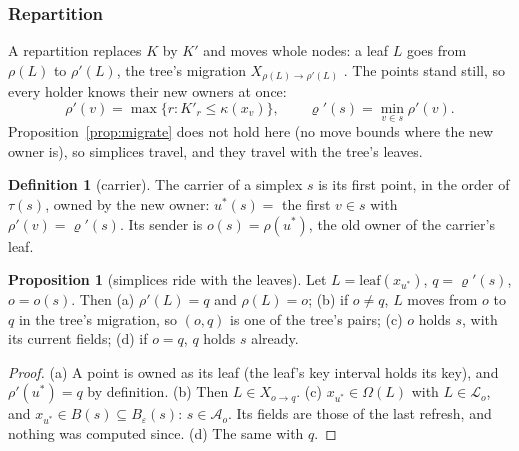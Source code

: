 \documentclass[10pt,a4paper]{article}
\theoremstyle{definition}
\newtheorem{definition}{Definition}
\newtheorem{proposition}{Proposition}
\begin{document}
\subsubsection{Repartition}

A repartition replaces $K$ by $K'$ and moves whole nodes: a leaf $L$ goes
from $\rho(L)$ to $\rho'(L)$, the tree's migration $X_{\rho(L) \to
\rho'(L)}$ \cite{bamrpart}. The points stand still, so every holder knows
their new owners at once:
\[
  \rho'(v) = \max\{ r : K'_r \le \kappa(x_v) \}, \qquad
  \varrho'(s) = \min_{v \in s} \rho'(v).
\]
Proposition~\ref{prop:migrate} does not hold here (no move bounds where
the new owner is), so simplices travel, and they travel with the tree's
leaves.

\begin{definition}[carrier]
  \label{def:carrier}
  The carrier of a simplex $s$ is its first point, in the order of
  $\tau(s)$, owned by the new owner: $u^*(s) = $ the first $v \in s$ with
  $\rho'(v) = \varrho'(s)$. Its sender is $o(s) = \rho(u^*)$, the old
  owner of the carrier's leaf.
\end{definition}

\begin{proposition}[simplices ride with the leaves]
  \label{prop:carrier}
  Let $L = \mathrm{leaf}(x_{u^*})$, $q = \varrho'(s)$, $o = o(s)$. Then (a)
  $\rho'(L) = q$ and $\rho(L) = o$; (b) if $o \ne q$, $L$ moves from $o$
  to $q$ in the tree's migration, so $(o, q)$ is one of the tree's pairs;
  (c) $o$ holds $s$, with its current fields; (d) if $o = q$, $q$ holds
  $s$ already.
\end{proposition}
\begin{proof}
  (a) A point is owned as its leaf (the leaf's key interval holds its
  key), and $\rho'(u^*) = q$ by definition. (b) Then $L \in X_{o \to q}$.
  (c) $x_{u^*} \in \Omega(L)$ with $L \in \mathcal{L}_o$, and $x_{u^*} \in
  B(s) \subseteq B_\varepsilon(s)$: $s \in \mathcal{A}_o$. Its fields are
  those of the last refresh, and nothing was computed since. (d) The same
  with $q$.
\end{proof}
\end{document}
